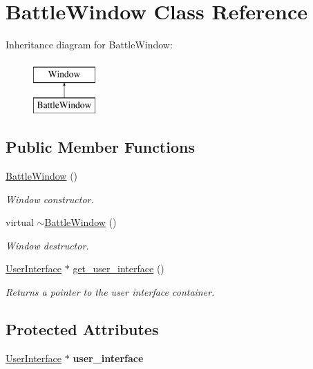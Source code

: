 \hypertarget{classBattleWindow}{}\section{Battle\+Window Class Reference}
\label{classBattleWindow}
Inheritance diagram for Battle\+Window\+:\begin{figure}[H]
\begin{center}
\leavevmode
\includegraphics[height=2.000000cm]{classBattleWindow}
\end{center}
\end{figure}
\subsection*{Public Member Functions}
\begin{DoxyCompactItemize}
\item 
\mbox{\hyperlink{classBattleWindow_a9f7e70c225b63503da672c0c6eab0c08}{Battle\+Window}} ()
\begin{DoxyCompactList}\small\item\em Window constructor. \end{DoxyCompactList}\item 
\mbox{\label{classBattleWindow_a1407b4532e34b603c8353907b6bed45a}} 
virtual \mbox{\hyperlink{classBattleWindow_a1407b4532e34b603c8353907b6bed45a}{$\sim$\+Battle\+Window}} ()
\begin{DoxyCompactList}\small\item\em Window destructor. \end{DoxyCompactList}\item 
\mbox{\hyperlink{classUserInterface}{User\+Interface}} $\ast$ \mbox{\hyperlink{classBattleWindow_a1190090493fa2ad632c5afb2a53744f2}{get\+\_\+user\+\_\+interface}} ()
\begin{DoxyCompactList}\small\item\em Returns a pointer to the user interface container. \end{DoxyCompactList}\end{DoxyCompactItemize}
\subsection*{Protected Attributes}
\begin{DoxyCompactItemize}
\item 
\mbox{\label{classBattleWindow_a4edfdbf430dff202ff490b218db4572c}} 
\mbox{\hyperlink{classUserInterface}{User\+Interface}} $\ast$ {\bfseries user\+\_\+interface}
\end{DoxyCompactItemize}


